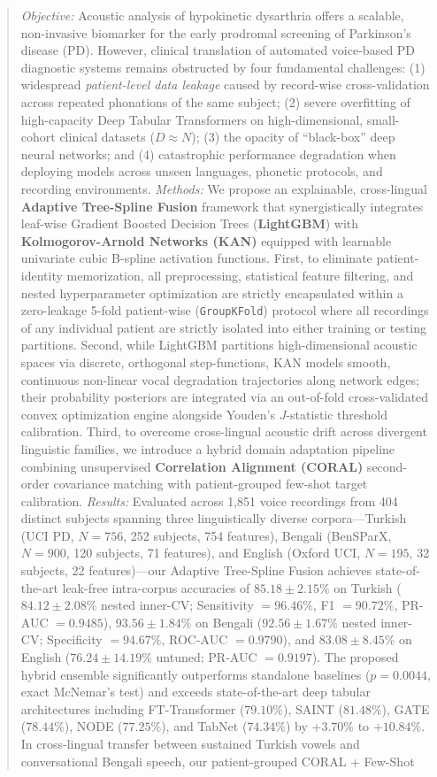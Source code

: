 \documentclass[journal,10pt,twoside]{IEEEtran}
\begin{document}
\begin{abstract}
\textit{Objective:} Acoustic analysis of hypokinetic dysarthria offers a scalable, non-invasive biomarker for the early prodromal screening of Parkinson's disease (PD). However, clinical translation of automated voice-based PD diagnostic systems remains obstructed by four fundamental challenges: (1) widespread \textit{patient-level data leakage} caused by record-wise cross-validation across repeated phonations of the same subject; (2) severe overfitting of high-capacity Deep Tabular Transformers on high-dimensional, small-cohort clinical datasets ($D \approx N$); (3) the opacity of ``black-box'' deep neural networks; and (4) catastrophic performance degradation when deploying models across unseen languages, phonetic protocols, and recording environments. \textit{Methods:} We propose an explainable, cross-lingual \textbf{Adaptive Tree-Spline Fusion} framework that synergistically integrates leaf-wise Gradient Boosted Decision Trees (\textbf{LightGBM}) with \textbf{Kolmogorov-Arnold Networks (KAN)} equipped with learnable univariate cubic B-spline activation functions. First, to eliminate patient-identity memorization, all preprocessing, statistical feature filtering, and nested hyperparameter optimization are strictly encapsulated within a zero-leakage 5-fold patient-wise (\texttt{GroupKFold}) protocol where all recordings of any individual patient are strictly isolated into either training or testing partitions. Second, while LightGBM partitions high-dimensional acoustic spaces via discrete, orthogonal step-functions, KAN models smooth, continuous non-linear vocal degradation trajectories along network edges; their probability posteriors are integrated via an out-of-fold cross-validated convex optimization engine alongside Youden's $J$-statistic threshold calibration. Third, to overcome cross-lingual acoustic drift across divergent linguistic families, we introduce a hybrid domain adaptation pipeline combining unsupervised \textbf{Correlation Alignment (CORAL)} second-order covariance matching with patient-grouped few-shot target calibration. \textit{Results:} Evaluated across 1,851 voice recordings from 404 distinct subjects spanning three linguistically diverse corpora---Turkish (UCI PD, $N=756$, 252 subjects, 754 features), Bengali (BenSParX, $N=900$, 120 subjects, 71 features), and English (Oxford UCI, $N=195$, 32 subjects, 22 features)---our Adaptive Tree-Spline Fusion achieves state-of-the-art leak-free intra-corpus accuracies of $85.18 \pm 2.15\%$ on Turkish ($84.12 \pm 2.08\%$ nested inner-CV; Sensitivity $= 96.46\%$, F1 $= 90.72\%$, PR-AUC $= 0.9485$), $93.56 \pm 1.84\%$ on Bengali ($92.56 \pm 1.67\%$ nested inner-CV; Specificity $= 94.67\%$, ROC-AUC $= 0.9790$), and $83.08 \pm 8.45\%$ on English ($76.24 \pm 14.19\%$ untuned; PR-AUC $= 0.9197$). The proposed hybrid ensemble significantly outperforms standalone baselines ($p = 0.0044$, exact McNemar's test) and exceeds state-of-the-art deep tabular architectures including FT-Transformer ($79.10\%$), SAINT ($81.48\%$), GATE ($78.44\%$), NODE ($77.25\%$), and TabNet ($74.34\%$) by $+3.70\%$ to $+10.84\%$. In cross-lingual transfer between sustained Turkish vowels and conversational Bengali speech, our patient-grouped CORAL + Few-Shot 
\end{abstract}
\end{document}
